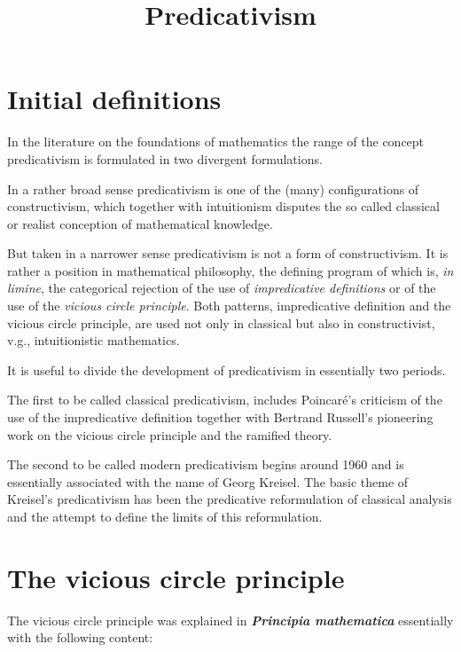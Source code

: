 \documentclass[12pt]{article}
\begin{document}
\title{Predicativism}\Large 
\maketitle

\tableofcontents

\section{Initial definitions}\normalsize

In the literature on the foundations of mathematics the range of the concept predicativism is formulated in two divergent formulations.

In a rather broad sense predicativism is one of the (many) configurations of constructivism, which together with intuitionism disputes the so called classical or realist conception of mathematical knowledge.

But taken in a narrower sense predicativism is not a form of constructivism. It is rather a position in mathematical philosophy, the defining program of which is, \emph{in limine}, the categorical rejection of the use of \emph{impredicative definitions} or of the use of the \emph{vicious circle principle}. Both patterns, impredicative definition and the vicious circle principle, are used not only in classical but also in constructivist, v.g., intuitionistic mathematics. 

It is useful to divide the development of predicativism in essentially two periods.

The first to be called classical predicativism, includes Poincar\'{e}'s criticism of the use of the impredicative definition together with Bertrand Russell's pioneering work on the vicious circle principle and the ramified theory. 

The second to be called modern predicativism begins around 1960 and is essentially associated with the name of Georg Kreisel. The basic theme of Kreisel's predicativism has been the predicative reformulation of classical analysis and the attempt to define the limits of this reformulation.

\section{The vicious circle principle}\normalsize

The vicious circle principle was explained in \textbf{\emph{Principia mathematica}} essentially with the following content:
\end{document}
